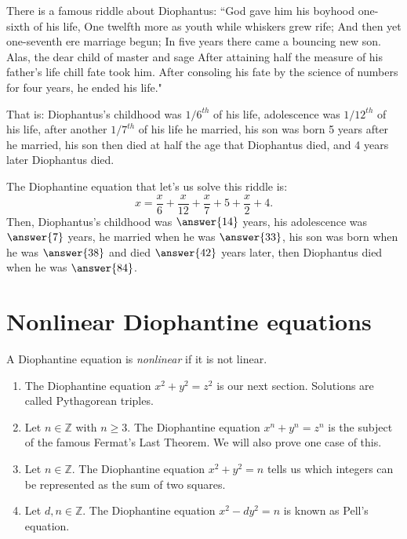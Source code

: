 \documentclass{ximera}
\begin{document}
\begin{example}
 There is a famous riddle about Diophantus: ``God gave him his boyhood one-sixth of his life, One twelfth more as youth while whiskers grew rife; And then yet one-seventh ere marriage begun; In five years there came a bouncing new son. Alas, the dear child of master and sage After attaining half the measure of his father's life chill fate took him. After consoling his fate by the science of numbers for four years, he ended his life." 
 
 That is: Diophantus's childhood was $1/6^{th}$ of his life, adolescence was $1/12^{th}$ of his life, after another $1/7^{th}$ of his life he married, his son was born 5 years after he married, his son then died at half the age that Diophantus died, and 4 years later Diophantus died.
 
The Diophantine equation that let's us solve this riddle is: \[x=\frac{x}{6}+\frac{x}{12}+\frac{x}{7}+5+\frac{x}{2}+4.\] Then, Diophantus's childhood was $\answer{14}$ years, his adolescence was $\answer{7}$ years, he married when he was $\answer{33}$, his son was born when he was $\answer{38}$ and died $\answer{42}$ years later, then Diophantus died when he was $\answer{84}$.
\end{example}

\section*{Nonlinear Diophantine equations}
\begin{definition}
 A Diophantine equation is \emph{nonlinear} if it is not linear.
\end{definition}

\begin{example}
 
\begin{enumerate}
 \item The Diophantine equation $x^2+y^2=z^2$ is our next section. Solutions are called Pythagorean triples.
 \item Let $n\in\mathbb{Z}$ with $n\geq 3$. The Diophantine equation $x^n+y^n=z^n$ is the subject of the famous Fermat's Last Theorem. We will also prove one case of this.
 \item Let $n\in\mathbb{Z}$. The Diophantine equation $x^2+y^2=n$ tells us which integers can be represented as the sum of two squares.
 \item Let $d,n\in\mathbb{Z}$. The Diophantine equation $x^2-dy^2=n$ is known as Pell's equation.
\end{enumerate}
\end{example}
\end{document}
